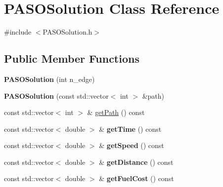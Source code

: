 \hypertarget{class_p_a_s_o_solution}{}\section{P\+A\+S\+O\+Solution Class Reference}
\label{class_p_a_s_o_solution}


{\ttfamily \#include $<$P\+A\+S\+O\+Solution.\+h$>$}

\subsection*{Public Member Functions}
\begin{DoxyCompactItemize}
\item 
\hypertarget{class_p_a_s_o_solution_a5326052360dec1e181106137405c592a}{}{\bfseries P\+A\+S\+O\+Solution} (int n\+\_\+edge)\label{class_p_a_s_o_solution_a5326052360dec1e181106137405c592a}

\item 
\hypertarget{class_p_a_s_o_solution_a03dfbabea35ebcb073a928a46cc29659}{}{\bfseries P\+A\+S\+O\+Solution} (const std\+::vector$<$ int $>$ \&path)\label{class_p_a_s_o_solution_a03dfbabea35ebcb073a928a46cc29659}

\item 
const std\+::vector$<$ int $>$ \& \hyperlink{class_p_a_s_o_solution_a022d9b9615bca2c8aab3dd7ef3c75546}{get\+Path} () const 
\item 
\hypertarget{class_p_a_s_o_solution_a2ee73d95ee4ca433028250f476c17f71}{}const std\+::vector$<$ double $>$ \& {\bfseries get\+Time} () const \label{class_p_a_s_o_solution_a2ee73d95ee4ca433028250f476c17f71}

\item 
\hypertarget{class_p_a_s_o_solution_a22a0d019b4bf67770c0d7d81c2af8e23}{}const std\+::vector$<$ double $>$ \& {\bfseries get\+Speed} () const \label{class_p_a_s_o_solution_a22a0d019b4bf67770c0d7d81c2af8e23}

\item 
\hypertarget{class_p_a_s_o_solution_a2d1da8ba430e8e9e1c69a71b0a61b841}{}const std\+::vector$<$ double $>$ \& {\bfseries get\+Distance} () const \label{class_p_a_s_o_solution_a2d1da8ba430e8e9e1c69a71b0a61b841}

\item 
\hypertarget{class_p_a_s_o_solution_a17b7dafcb7b0dbcd1cda47170606103c}{}const std\+::vector$<$ double $>$ \& {\bfseries get\+Fuel\+Cost} () const \label{class_p_a_s_o_solution_a17b7dafcb7b0dbcd1cda47170606103c}


\end{DoxyCompactItemize}
